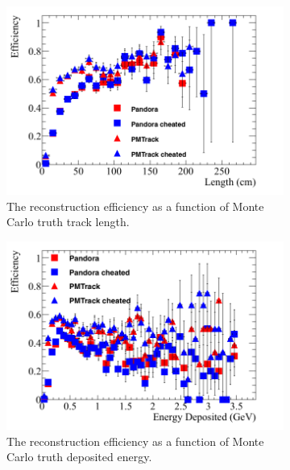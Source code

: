 \begin{figure}[h!]
  \centering
  \begin{subfigure}{0.48\textwidth}
        \centering
        \includegraphics[width=\textwidth]{Effic_ProtonEnrich_500V_Proton_Length}
        \caption{The reconstruction efficiency as a function of Monte Carlo truth track length.}
        \label{fig:Prot_Effic_Len}
  \end{subfigure}%
  \hspace{0.03\textwidth}%
  \begin{subfigure}{0.48\textwidth}
        \centering
        \includegraphics[width=\textwidth]{Effic_ProtonEnrich_500V_Proton_EnDepos}
        \caption{The reconstruction efficiency as a function of Monte Carlo truth deposited energy.}
        \label{fig:Prot_Effic_EnDepos}
  \end{subfigure}
  \begin{subfigure}{0.48\textwidth}

\end{subfigure}
\end{figure}
